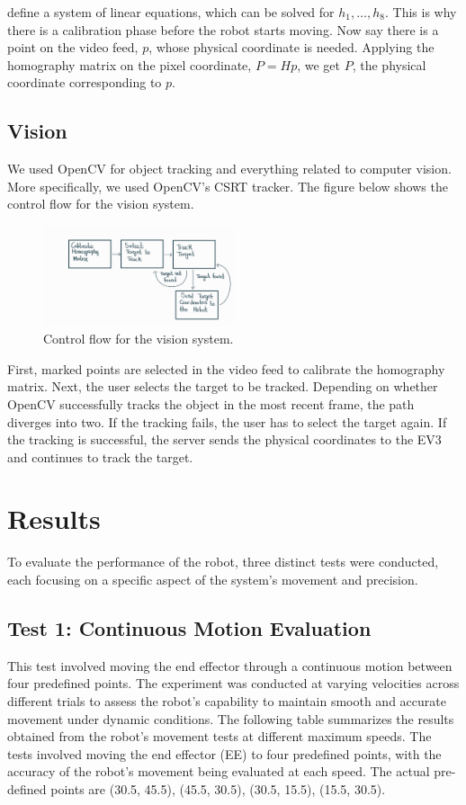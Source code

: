\documentclass[11pt]{article}
\begin{document}
define a system of linear equations, which can be solved for $h_1, \dots, h_8$. This is why there is a calibration phase before the robot starts moving. Now
say there is a point on the video feed, $p$, whose physical coordinate is needed. Applying the homography matrix on the pixel coordinate, $P = Hp$, we get
$P$, the physical coordinate corresponding to $p$.

\subsection{Vision}
We used OpenCV for object tracking and everything related to computer vision. More specifically, we used OpenCV's CSRT
tracker. The figure below shows the control flow for the vision system.

\begin{figure}[h]
\centering
\includegraphics[width=0.5\textwidth]{VisionSystem.jpg}
\caption{Control flow for the vision system.}
\label{fig:figure4}
\end{figure}

First, marked points are selected in the video
feed to calibrate the homography matrix. Next, the user selects the target to be tracked. Depending on whether OpenCV
successfully tracks the object in the most recent frame, the path diverges into two. If the tracking fails, the user has
to select the target again. If the tracking is successful, the server sends the physical coordinates to the EV3 and continues
to track the target.


\section{Results}
To evaluate the performance of the robot, three distinct tests were conducted, each focusing on a specific aspect of the system's movement and precision.
\subsection{Test 1: Continuous Motion Evaluation}
This test involved moving the end effector through a continuous motion between four predefined points. The experiment was conducted at varying velocities across different trials to assess the robot's capability to maintain smooth and accurate movement under dynamic conditions. The following table summarizes the results obtained from the robot's movement tests at different maximum speeds. The tests involved moving the end effector (EE) to four predefined points, with the accuracy of the robot's movement being evaluated at each speed. \newline
\noindent
The actual pre-defined points are (30.5, 45.5), (45.5, 30.5), (30.5, 15.5), (15.5, 30.5).
\end{document}
